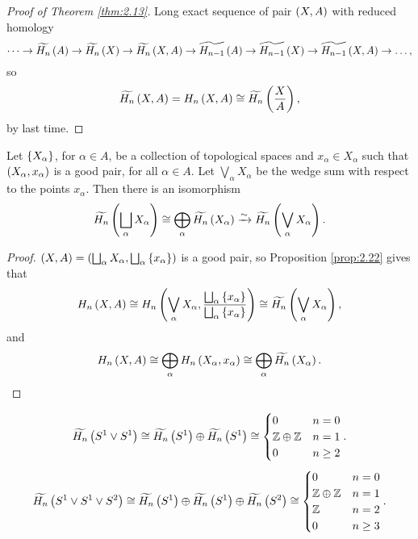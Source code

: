 \begin{proof}[Proof of Theorem \ref{thm:2.13}]
Long exact sequence of pair $ \left( X, A \right) $ with reduced homology
$$ \dots \to \widetilde{H_n}\left( A \right) \to \widetilde{H_n}\left( X \right) \to \widetilde{H_n}\left( X, A \right) \to \widetilde{H_{n - 1}}\left( A \right) \to \widetilde{H_{n - 1}}\left( X \right) \to \widetilde{H_{n - 1}}\left( X, A \right) \to \dots, $$
so
$$ \widetilde{H_n}\left( X, A \right) = H_n\left( X, A \right) \cong \widetilde{H_n}\left( \dfrac{X}{A} \right), $$
by last time.
\end{proof}

\pagebreak


\begin{corollary}
Let $ \left\{ X_\alpha \right\} $, for $ \alpha \in A $, be a collection of topological spaces and $ x_\alpha \in X_\alpha $ such that $ \left( X_\alpha, x_\alpha \right) $ is a good pair, for all $ \alpha \in A $. Let $ \bigvee_\alpha X_\alpha $ be the wedge sum with respect to the points $ x_\alpha $. Then there is an isomorphism
$$ \widetilde{H_n}\left( \bigsqcup_\alpha X_\alpha \right) \cong \bigoplus_\alpha \widetilde{H_n}\left( X_\alpha \right) \xrightarrow{\sim} \widetilde{H_n}\left( \bigvee_\alpha X_\alpha \right). $$
\end{corollary}

\begin{proof}
$ \left( X, A \right) = \left( \bigsqcup_\alpha X_\alpha, \bigsqcup_\alpha \left\{ x_\alpha \right\} \right) $ is a good pair, so Proposition \ref{prop:2.22} gives that
$$ H_n\left( X, A \right) \cong H_n\left( \bigvee_\alpha X_\alpha, \dfrac{\bigsqcup_\alpha \left\{ x_\alpha \right\}}{\bigsqcup_\alpha \left\{ x_\alpha \right\}} \right) \cong \widetilde{H_n}\left( \bigvee_\alpha X_\alpha \right), $$
and
$$ H_n\left( X, A \right) \cong \bigoplus_\alpha H_n\left( X_\alpha, x_\alpha \right) \cong \bigoplus_\alpha \widetilde{H_n}\left( X_\alpha \right). $$
\end{proof}

\begin{example*}
$$ \widetilde{H_n}\left( S^1 \vee S^1 \right) \cong \widetilde{H_n}\left( S^1 \right) \oplus \widetilde{H_n}\left( S^1 \right) \cong
\begin{cases}
0 & n = 0 \\
\mathbb{Z} \oplus \mathbb{Z} & n = 1 \\
0 & n \ge 2
\end{cases}.
$$
$$ \widetilde{H_n}\left( S^1 \vee S^1 \vee S^2 \right) \cong \widetilde{H_n}\left( S^1 \right) \oplus \widetilde{H_n}\left( S^1 \right) \oplus \widetilde{H_n}\left( S^2 \right) \cong
\begin{cases}
0 & n = 0 \\
\mathbb{Z} \oplus \mathbb{Z} & n = 1 \\
\mathbb{Z} & n = 2 \\
0 & n \ge 3
\end{cases}.
$$
\end{example*}

